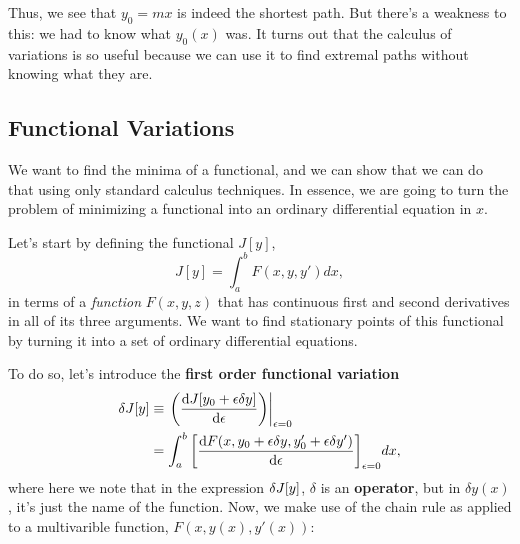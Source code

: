 Thus, we see that $y_0 = mx$ is indeed the shortest path. But there's a weakness to this: we had to know what $y_0(x)$ was. It turns out that the calculus of variations is so useful because we can use it to find extremal paths without knowing what they are.

\subsection{Functional Variations}
We want to find the minima of a functional, and we can show that we can do that using only standard calculus techniques. In essence, we are going to turn the problem of minimizing a functional into an ordinary differential equation in $x$.

Let's start by defining the functional $J[y]$,
\begin{equation}
  \label{eq:generic_functional}
  J[y] = \int_a^b F(x, y, y') dx,
\end{equation}
in terms of a \emph{function} $F(x, y, z)$ that has continuous first and second derivatives in all of its three arguments. We want to find stationary points  of this functional by turning it into a set of ordinary differential equations.

To do so, let's introduce the \textbf{first order functional variation}
\begin{equation}
  \label{eq:first_order_functional_variation}
  \begin{split}
    \var{J[y]} & \equiv \eval{\qty(\dv{J[y_0+\epsilon \delta y]}{\epsilon})}_{\epsilon=0}\\
    & = \int_a^b \qty[\dv{F(x, y_0 + \epsilon \delta y, y_0' + \epsilon \delta y')}{\epsilon}]_{\epsilon = 0} dx,    
  \end{split}
\end{equation}
where here we note that in the expression $\var{J[y]}$, $\delta$ is an \textbf{operator}, but in $\delta y(x)$, it's just the name of the function. Now, we make use of the chain rule as applied to a multivarible function, $F(x, y(x), y'(x))$:

